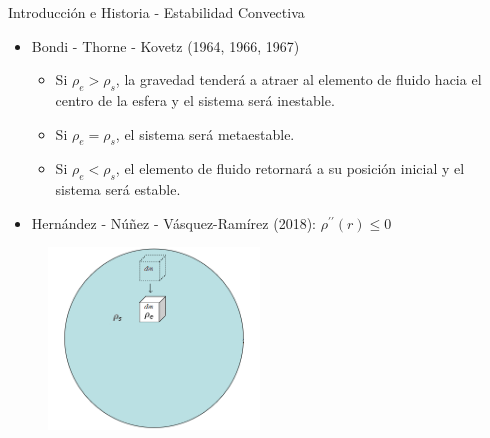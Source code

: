 \documentclass[handout,t]{beamer}
\begin{document}
\begin{frame}{Introducción e Historia - Estabilidad Convectiva}

\begin{itemize}

\vspace{-5mm}

\item Bondi - Thorne - Kovetz (1964, 1966, 1967)

\begin{itemize}
    \item Si $\rho_{e} > \rho_{s}$, la gravedad tenderá a atraer al elemento de fluido hacia el centro de la esfera y el sistema será inestable.
    \vspace{2mm}
    \item Si $\rho_{e} = \rho_{s}$, el sistema será metaestable.
    \vspace{2mm}
    \item Si $\rho_{e} < \rho_{s}$, el elemento de fluido retornará a su posición inicial y el sistema será estable.
\end{itemize}

\item Hernández - Núñez - Vásquez-Ramírez (2018): 
$\rho^{\prime \prime} (r) \leq 0$

\end{itemize}

\begin{figure}[h]
\includegraphics[width=0.5\textwidth]{Flota.png}
\end{figure}



\end{frame}
\end{document}
